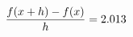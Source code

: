\documentclass[preview]{standalone}
\begin{document}
\begin{align*}
\special{dvisvgm:raw <g id='unique000'>}\frac{f(x+h)-f(x)}{h} = 2.013\special{dvisvgm:raw </g>}
\end{align*}
\end{document}
